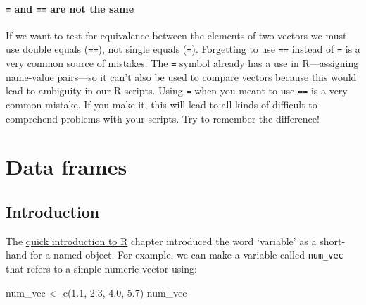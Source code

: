 \documentclass[
]{book}
\newenvironment{Shaded}{\begin{snugshade}}{\end{snugshade}}
\newcommand{\FloatTok}[1]{\textcolor[rgb]{0.00,0.00,0.81}{#1}}
\newcommand{\FunctionTok}[1]{\textcolor[rgb]{0.00,0.00,0.00}{#1}}
\newcommand{\NormalTok}[1]{#1}
\newcommand{\OtherTok}[1]{\textcolor[rgb]{0.56,0.35,0.01}{#1}}
\newenvironment{greybox}{
  \definecolor{shadecolor}{rgb}{0.95,0.95,0.95}  %
  \color{black}
  \begin{shaded}}
 {\end{shaded}}
\newenvironment{infobox}[1]
  {
  \begin{itemize}
  \renewcommand{\labelitemi}{
    \raisebox{-.7\height}[0pt][0pt]{
      {\setkeys{Gin}{width=3em,keepaspectratio}
        \texttt{[image: images/\#1]}}
    }
  }
  \setlength{\fboxsep}{1em}
  \begin{greybox}
  \item
  }
  {
  \end{greybox}
  \end{itemize}
  }
\begin{document}
\begin{infobox}{warning}

\hypertarget{and-are-not-the-same}{%
\subsubsection*{\texorpdfstring{\texttt{=} and \texttt{==} are not the same}{= and == are not the same}}\label{and-are-not-the-same}}

If we want to test for equivalence between the elements of two vectors we must use double equals (\texttt{==}), not single equals (\texttt{=}). Forgetting to use \texttt{==} instead of \texttt{=} is a very common source of mistakes. The \texttt{=} symbol already has a use in R---assigning name-value pairs---so it can't also be used to compare vectors because this would lead to ambiguity in our R scripts. Using \texttt{=} when you meant to use \texttt{==} is a very common mistake. If you make it, this will lead to all kinds of difficult-to-comprehend problems with your scripts. Try to remember the difference!

\end{infobox}

\hypertarget{data-frames}{%
\chapter{Data frames}\label{data-frames}}

\hypertarget{introduction-1}{%
\section{Introduction}\label{introduction-1}}

The \protect\hyperlink{quick-intro-to-r}{quick introduction to R} chapter introduced the word `variable' as a short-hand for a named object. For example, we can make a variable called \texttt{num\_vec} that refers to a simple numeric vector using:

\begin{Shaded}
\begin{Highlighting}[]
\NormalTok{num\_vec }\OtherTok{\textless{}{-}} \FunctionTok{c}\NormalTok{(}\FloatTok{1.1}\NormalTok{, }\FloatTok{2.3}\NormalTok{, }\FloatTok{4.0}\NormalTok{, }\FloatTok{5.7}\NormalTok{)}
\NormalTok{num\_vec}
\end{Highlighting}
\end{Shaded}
\end{document}
